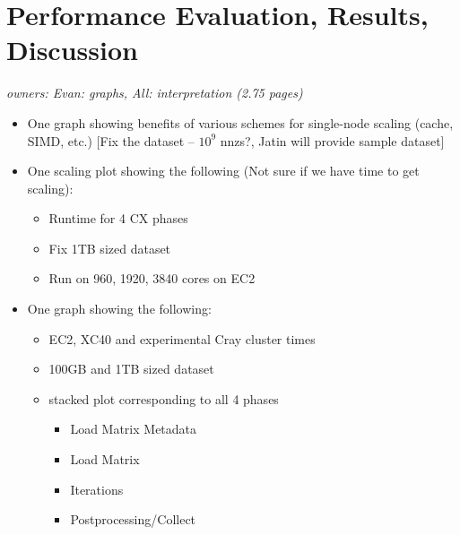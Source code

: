 
\section{Performance Evaluation, Results, Discussion}

\textit{owners: Evan: graphs, All: interpretation (2.75 pages)}
\begin{itemize}
  \item One graph showing benefits of various schemes for single-node scaling (cache, SIMD, etc.) [Fix the dataset -- $10^9$ nnzs?, Jatin will provide sample dataset]
  \item One scaling plot showing the following (Not sure if we have time to get scaling):
  \begin{itemize}
    \item Runtime for 4 CX phases
    \item Fix 1TB sized dataset
    \item Run on 960, 1920, 3840 cores on EC2  
  \end{itemize}

  \item One graph showing the following:
  \begin{itemize}
    \item EC2, XC40 and experimental Cray cluster times
    \item 100GB and 1TB sized dataset
    \item stacked plot corresponding to all 4 phases
    \begin{itemize}
      \item Load Matrix Metadata
      \item Load Matrix
      \item Iterations
      \item Postprocessing/Collect
    

\end{itemize}
\end{itemize}
\end{itemize}
